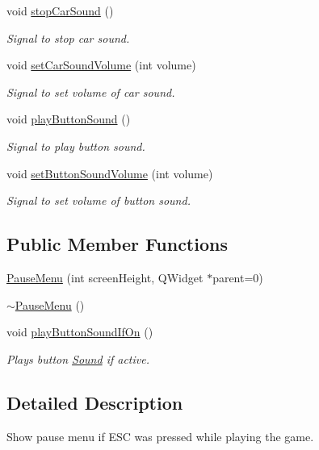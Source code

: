 \begin{DoxyCompactItemize}
void \mbox{\hyperlink{class_pause_menu_a0d4bdd4e4dfabd83cb41eb872f15bb8a}{stop\+Car\+Sound}} ()
\begin{DoxyCompactList}\small\item\em Signal to stop car sound. \end{DoxyCompactList}\item 
void \mbox{\hyperlink{class_pause_menu_a4f2c59b2eac366bf3a6a133c0b39ac56}{set\+Car\+Sound\+Volume}} (int volume)
\begin{DoxyCompactList}\small\item\em Signal to set volume of car sound. \end{DoxyCompactList}\item 
void \mbox{\hyperlink{class_pause_menu_a4ce973fdc189fbe933282d6dbf307ccc}{play\+Button\+Sound}} ()
\begin{DoxyCompactList}\small\item\em Signal to play button sound. \end{DoxyCompactList}\item 
void \mbox{\hyperlink{class_pause_menu_a7b5a4790719c2c8692ce3a30ff1eb6e6}{set\+Button\+Sound\+Volume}} (int volume)
\begin{DoxyCompactList}\small\item\em Signal to set volume of button sound. \end{DoxyCompactList}\end{DoxyCompactItemize}
\subsection*{Public Member Functions}
\begin{DoxyCompactItemize}
\item 
\mbox{\hyperlink{class_pause_menu_aa05ad1aa7b76298fb296d65a41ca2f9b}{Pause\+Menu}} (int screen\+Height, Q\+Widget $\ast$parent=0)
\item 
\mbox{\hyperlink{class_pause_menu_af30f0b8f5f59c6779434295a731b0e35}{$\sim$\+Pause\+Menu}} ()
\item 
void \mbox{\hyperlink{class_pause_menu_ac4f80ef846911fca05673e0e11d33e20}{play\+Button\+Sound\+If\+On}} ()
\begin{DoxyCompactList}\small\item\em Plays button \mbox{\hyperlink{class_sound}{Sound}} if active. \end{DoxyCompactList}\end{DoxyCompactItemize}


\subsection{Detailed Description}
Show pause menu if E\+SC was pressed while playing the game. 


